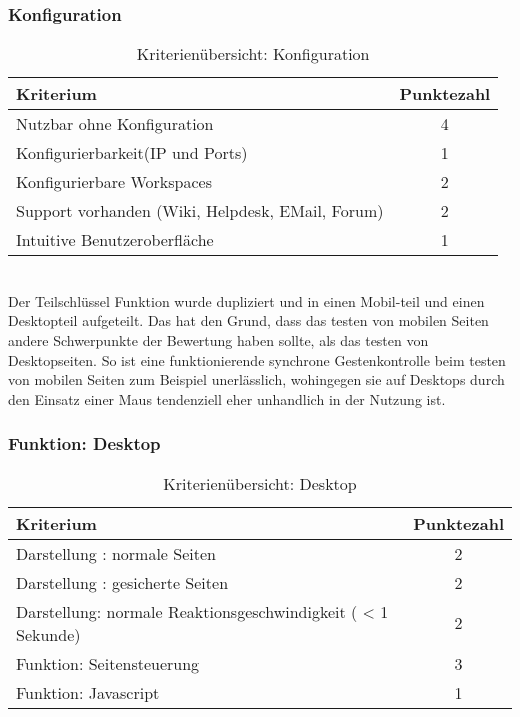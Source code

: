 \subsubsection{Konfiguration}
\begin{table}[H]
 	\vspace{-30pt}
 	\centering
		\begin{tabular}{| p{12cm} | c|}
			\hline
				Kriterium		 &	Punktezahl\\
			\hline
			\hline
				Nutzbar ohne Konfiguration			&4\\
				Konfigurierbarkeit(IP und Ports)			&	1	\\
				Konfigurierbare Workspaces			&	2	\\
				Support vorhanden (Wiki, Helpdesk, EMail, Forum)				&	2	\\
				Intuitive Benutzeroberfläche			&	1	\\
				\hline
		\end{tabular}
	\caption{Kriterienübersicht: Konfiguration}
\end{table}

\\Der Teilschlüssel Funktion wurde dupliziert und in einen Mobil-teil und einen Desktopteil aufgeteilt. Das hat den Grund, dass das testen von mobilen Seiten andere Schwerpunkte der Bewertung haben sollte, als das testen von Desktopseiten. So ist eine funktionierende synchrone Gestenkontrolle beim testen von mobilen Seiten zum Beispiel unerlässlich, wohingegen sie auf Desktops durch den Einsatz einer Maus tendenziell eher unhandlich in der Nutzung ist.
\subsubsection{Funktion: Desktop}
\begin{table}[H]
 	\vspace{-30pt}
 	\centering
		\begin{tabular}{| p{12cm} | c|}
			\hline
				Kriterium		 &	Punktezahl\\
			\hline
			\hline
				Darstellung : normale Seiten			&2\\
				Darstellung : gesicherte Seiten		&	2	\\
				 Darstellung: normale Reaktionsgeschwindigkeit ( < 1 Sekunde)	&	2	\\
				Funktion: Seitensteuerung			&	3	\\
				Funktion: Javascript			&	1	\\
				\hline
		\end{tabular}
	\caption{Kriterienübersicht: Desktop}
\end{table}


